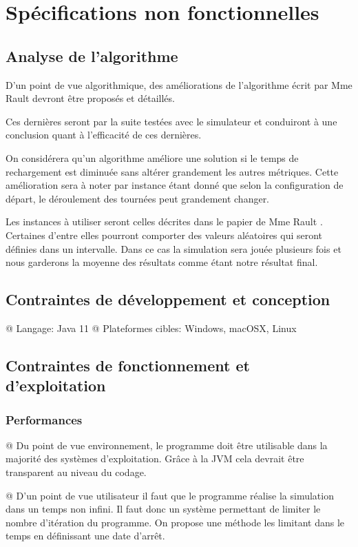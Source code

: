 \documentclass[final]{polytech/polytech}
\begin{document}
\chapter{Spécifications non fonctionnelles}
	\section{Analyse de l'algorithme}
		D'un point de vue algorithmique, des améliorations de l'algorithme écrit par Mme Rault \cite{Rault:chargers} devront être proposés et détaillés.
			
		Ces dernières seront par la suite testées avec le simulateur et conduiront à une conclusion quant à l'efficacité de ces dernières.
		
		On considérera qu'un algorithme améliore une solution si le temps de rechargement est diminuée sans altérer grandement les autres métriques.
		Cette amélioration sera à noter par instance étant donné que selon la configuration de départ, le déroulement des tournées peut grandement changer.
		
		Les instances à utiliser seront celles décrites dans le papier de Mme Rault \cite{Rault:chargers}.
		Certaines d'entre elles pourront comporter des valeurs aléatoires qui seront définies dans un intervalle.
		Dans ce cas la simulation sera jouée plusieurs fois et nous garderons la moyenne des résultats comme étant notre résultat final.

	\section{Contraintes de développement et conception}
		\begin{easylist}[itemize]
			@ Langage: Java 11
			@ Plateformes cibles: Windows, macOSX, Linux
		\end{easylist}
		
	\section{Contraintes de fonctionnement et d'exploitation}
		\subsection{Performances}
			\begin{easylist}
				@ Du point de vue environnement, le programme doit être utilisable dans la majorité des systèmes d'exploitation.
				Grâce à la JVM cela devrait être transparent au niveau du codage.
			
				@ D'un point de vue utilisateur il faut que le programme réalise la simulation dans un temps non infini.
				Il faut donc un système permettant de limiter le nombre d'itération du programme.
				On propose une méthode les limitant dans le temps en définissant une date d'arrêt.
			\end{easylist}
			
\end{document}
